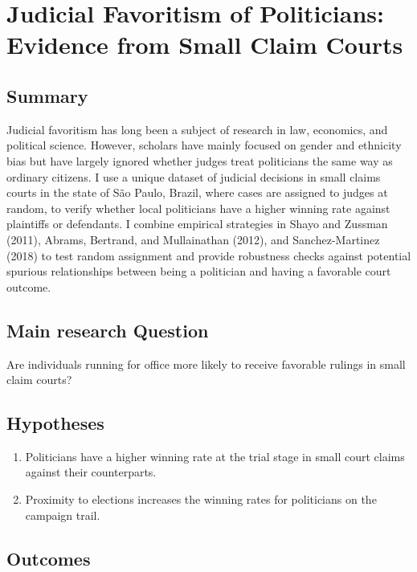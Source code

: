 \documentclass[]{article}
\title{}
\author{}
\date{}
\begin{document}
\hypertarget{title2}{%
\section{Judicial Favoritism of Politicians: Evidence from Small Claim
Courts}\label{title2}}

\hypertarget{summary}{%
\subsection{Summary}\label{summary}}

Judicial favoritism has long been a subject of research in law,
economics, and political science. However, scholars have mainly focused
on gender and ethnicity bias but have largely ignored whether judges
treat politicians the same way as ordinary citizens. I use a unique
dataset of judicial decisions in small claims courts in the state of São
Paulo, Brazil, where cases are assigned to judges at random, to verify
whether local politicians have a higher winning rate against plaintiffs
or defendants. I combine empirical strategies in Shayo and Zussman
(2011), Abrams, Bertrand, and Mullainathan (2012), and Sanchez-Martinez
(2018) to test random assignment and provide robustness checks against
potential spurious relationships between being a politician and having a
favorable court outcome.

\hypertarget{main-research-question}{%
\subsection{Main research Question}\label{main-research-question}}

Are individuals running for office more likely to receive favorable
rulings in small claim courts?

\hypertarget{hypotheses}{%
\subsection{Hypotheses}\label{hypotheses}}

\begin{enumerate}
\item
  Politicians have a higher winning rate at the trial stage in small
  court claims against their counterparts.
\item
  Proximity to elections increases the winning rates for politicians on
  the campaign trail.
\end{enumerate}

\hypertarget{outcomes}{%
\subsection{Outcomes}\label{outcomes}}
\end{document}
